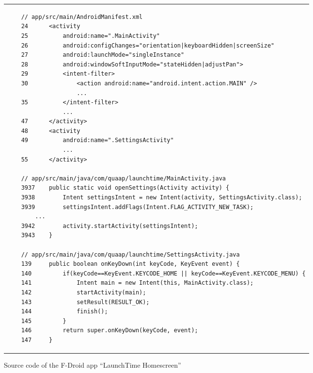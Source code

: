 \begin{figure}[htbp]
    \centering
    \begin{tabular*}{\linewidth}{l}
    \begin{lstlisting}
    // app/src/main/AndroidManifest.xml
    24      <activity
    25          android:name=".MainActivity"
    26          android:configChanges="orientation|keyboardHidden|screenSize"
    27          android:launchMode="singleInstance"
    28          android:windowSoftInputMode="stateHidden|adjustPan">
    29          <intent-filter>
    30              <action android:name="android.intent.action.MAIN" />
                    ...
    35          </intent-filter>
                ...
    47      </activity>
    48      <activity
    49          android:name=".SettingsActivity"
                ...
    55      </activity>

    // app/src/main/java/com/quaap/launchtime/MainActivity.java
    3937    public static void openSettings(Activity activity) {
    3938        Intent settingsIntent = new Intent(activity, SettingsActivity.class);
    3939        settingsIntent.addFlags(Intent.FLAG_ACTIVITY_NEW_TASK);
		...
    3942        activity.startActivity(settingsIntent);
    3943    }

    // app/src/main/java/com/quaap/launchtime/SettingsActivity.java
    139     public boolean onKeyDown(int keyCode, KeyEvent event) {
    140         if(keyCode==KeyEvent.KEYCODE_HOME || keyCode==KeyEvent.KEYCODE_MENU) {
    141             Intent main = new Intent(this, MainActivity.class);
    142             startActivity(main);
    143             setResult(RESULT_OK);
    144             finish();
    145         }
    146         return super.onKeyDown(keyCode, event);
    147     }
    \end{lstlisting}
    \end{tabular*}
    \caption{Source code of the F-Droid app ``LaunchTime Homescreen''}
    \label{code-launchtime}
    \end{figure}


